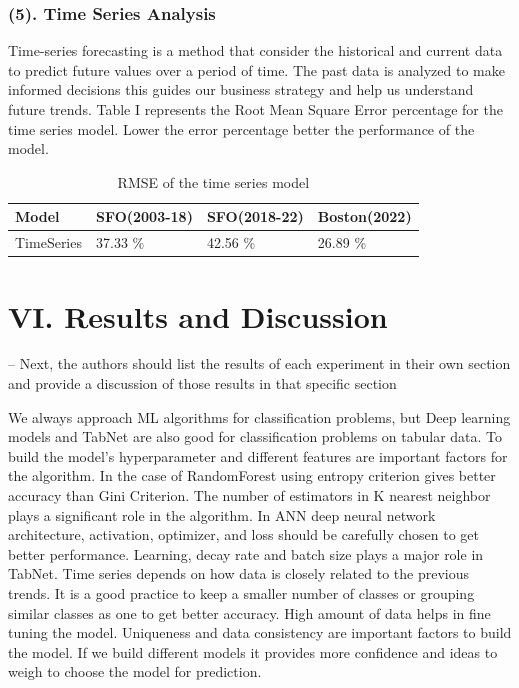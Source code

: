 \documentclass[11 pt,conference,final,]{IEEEtran}
\begin{document}
\subsubsection{(5). Time Series Analysis}\label{time-series-analysis}

Time-series forecasting is a method that consider the historical and
current data to predict future values over a period of time. The past
data is analyzed to make informed decisions this guides our business
strategy and help us understand future trends. Table I represents the
Root Mean Square Error percentage for the time series model. Lower the
error percentage better the performance of the model.

\begin{table}
\centering
\caption{\label{tab:unnamed-chunk-16}RMSE of the time series model}
\centering
\begin{tabular}[t]{l|l|l|l}
\hline
Model & SFO(2003-18) & SFO(2018-22) & Boston(2022)\\
\hline
TimeSeries & 37.33 \% & 42.56 \% & 26.89 \%\\
\hline
\end{tabular}
\end{table}

\section{VI. Results and Discussion}\label{vi.-results-and-discussion}

-- Next, the authors should list the results of each experiment in their
own section and provide a discussion of those results in that specific
section

We always approach ML algorithms for classification problems, but Deep
learning models and TabNet are also good for classification problems on
tabular data. To build the model's hyperparameter and different features
are important factors for the algorithm. In the case of RandomForest
using entropy criterion gives better accuracy than Gini Criterion. The
number of estimators in K nearest neighbor plays a significant role in
the algorithm. In ANN deep neural network architecture, activation,
optimizer, and loss should be carefully chosen to get better
performance. Learning, decay rate and batch size plays a major role in
TabNet. Time series depends on how data is closely related to the
previous trends. It is a good practice to keep a smaller number of
classes or grouping similar classes as one to get better accuracy. High
amount of data helps in fine tuning the model. Uniqueness and data
consistency are important factors to build the model. If we build
different models it provides more confidence and ideas to weigh to
choose the model for prediction.
\end{document}
